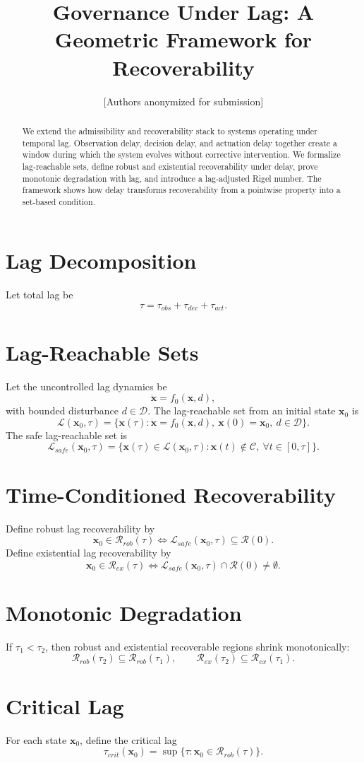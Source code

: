 \documentclass[letterpaper,10pt,conference]{ieeeconf}
\title{\bf Governance Under Lag: A Geometric Framework for Recoverability}
\author{[Authors anonymized for submission]}
\newcommand{\x}{\mathbf{x}}
\newcommand{\Rset}{\mathcal{R}}
\newcommand{\Rrob}{\mathcal{R}_{rob}}
\newcommand{\Cset}{\mathcal{C}}
\begin{document}
\maketitle
\thispagestyle{empty}
\pagestyle{empty}
\begin{abstract}
We extend the admissibility and recoverability stack to systems operating under temporal lag. Observation delay, decision delay, and actuation delay together create a window during which the system evolves without corrective intervention. We formalize lag-reachable sets, define robust and existential recoverability under delay, prove monotonic degradation with lag, and introduce a lag-adjusted Rigel number. The framework shows how delay transforms recoverability from a pointwise property into a set-based condition.
\end{abstract}
\section{Lag Decomposition}
Let total lag be
\[
\tau=\tau_{obs}+\tau_{dec}+\tau_{act}.
\]
\section{Lag-Reachable Sets}
Let the uncontrolled lag dynamics be
\[
\dot{\x}=f_0(\x,d),
\]
with bounded disturbance $d\in\mathcal{D}$.
The lag-reachable set from an initial state $\x_0$ is
\[
\mathcal{L}(\x_0,\tau)=\{\x(\tau): \dot{\x}=f_0(\x,d),\ \x(0)=\x_0,\ d\in\mathcal{D}\}.
\]
The safe lag-reachable set is
\[
\mathcal{L}_{safe}(\x_0,\tau)=\{\x(\tau)\in\mathcal{L}(\x_0,\tau): \x(t)\notin\Cset,\ \forall t\in[0,\tau]\}.
\]
\section{Time-Conditioned Recoverability}
Define robust lag recoverability by
\[
\x_0\in\Rrob(\tau)\iff \mathcal{L}_{safe}(\x_0,\tau)\subseteq \Rset(0).
\]
Define existential lag recoverability by
\[
\x_0\in\mathcal{R}_{ex}(\tau)\iff \mathcal{L}_{safe}(\x_0,\tau)\cap \Rset(0)\neq\emptyset.
\]
\section{Monotonic Degradation}
If $\tau_1<\tau_2$, then robust and existential recoverable regions shrink monotonically:
\[
\Rrob(\tau_2)\subseteq \Rrob(\tau_1),\qquad
\mathcal{R}_{ex}(\tau_2)\subseteq \mathcal{R}_{ex}(\tau_1).
\]
\section{Critical Lag}
For each state $\x_0$, define the critical lag
\[
\tau_{crit}(\x_0)=\sup\{\tau:\x_0\in\Rrob(\tau)\}.
\]
\end{document}
